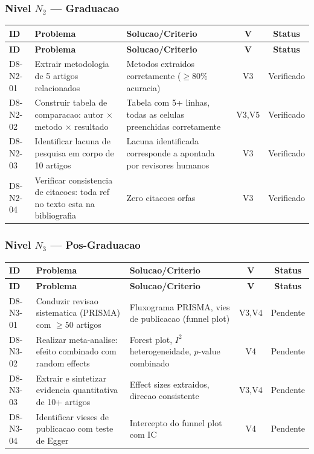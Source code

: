 \subsubsection{Nivel $N_2$ --- Graduacao}

\begin{longtable}{|p{2.0cm}|p{4.2cm}|p{4.2cm}|c|c|}
\hline
\textbf{ID} & \textbf{Problema} & \textbf{Solucao/Criterio} & \textbf{V} & \textbf{Status} \\
\hline
\endfirsthead
\hline
\textbf{ID} & \textbf{Problema} & \textbf{Solucao/Criterio} & \textbf{V} & \textbf{Status} \\
\hline
\endhead
\hline
\endfoot
D8-N2-01 & Extrair metodologia de 5 artigos relacionados & Metodos extraidos corretamente ($\geq 80\%$ acuracia) & V3 & Verificado \\
\hline
D8-N2-02 & Construir tabela de comparacao: autor $\times$ metodo $\times$ resultado & Tabela com 5+ linhas, todas as celulas preenchidas corretamente & V3,V5 & Verificado \\
\hline
D8-N2-03 & Identificar lacuna de pesquisa em corpo de 10 artigos & Lacuna identificada corresponde a apontada por revisores humanos & V3 & Verificado \\
\hline
D8-N2-04 & Verificar consistencia de citacoes: toda ref no texto esta na bibliografia & Zero citacoes orfas & V3 & Verificado \\
\hline
\end{longtable}

\subsubsection{Nivel $N_3$ --- Pos-Graduacao}

\begin{longtable}{|p{2.0cm}|p{4.2cm}|p{4.2cm}|c|c|}
\hline
\textbf{ID} & \textbf{Problema} & \textbf{Solucao/Criterio} & \textbf{V} & \textbf{Status} \\
\hline
\endfirsthead
\hline
\textbf{ID} & \textbf{Problema} & \textbf{Solucao/Criterio} & \textbf{V} & \textbf{Status} \\
\hline
\endhead
\hline
\endfoot
D8-N3-01 & Conduzir revisao sistematica (PRISMA) com $\geq 50$ artigos & Fluxograma PRISMA, vies de publicacao (funnel plot) & V3,V4 & Pendente \\
\hline
D8-N3-02 & Realizar meta-analise: efeito combinado com random effects & Forest plot, $I^{2}$ heterogeneidade, $p$-value combinado & V4 & Pendente \\
\hline
D8-N3-03 & Extrair e sintetizar evidencia quantitativa de 10+ artigos & Effect sizes extraidos, direcao consistente & V3,V4 & Pendente \\
\hline
D8-N3-04 & Identificar vieses de publicacao com teste de Egger & Intercepto do funnel plot com IC & V4 & Pendente \\
\hline
\end{longtable}

